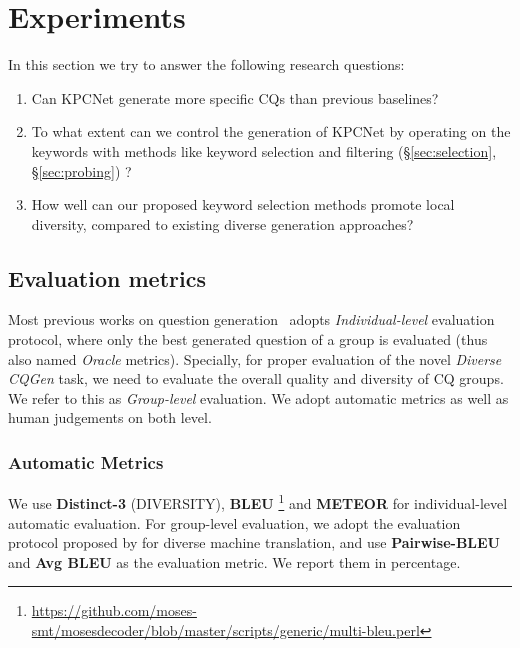 \section{Experiments}
\label{sec:experiments}
In this section we try to answer the following research questions: 
\begin{enumerate}
  \item Can KPCNet generate more specific CQs than previous baselines? 
  \item To what extent can we control the generation of KPCNet by operating on the keywords with methods like keyword selection and filtering (\S \ref{sec:selection}, \S \ref{sec:probing}) ?
  \item How well can our proposed keyword selection methods promote local diversity, compared to existing diverse generation approaches?
\end{enumerate}

\subsection{Evaluation metrics}
Most previous works on question 
generation~\citep{jain2017creativity, hu2018aspect, rao2019answer} 
adopts \textit{Individual-level} evaluation protocol, where only the best generated question of a group is evaluated (thus also named \textit{Oracle} metrics). Specially, for proper evaluation of the novel \textit{Diverse CQGen} task, we need to evaluate the overall quality and diversity of CQ groups. We refer to this as \textit{Group-level} evaluation. We adopt automatic metrics as well as human judgements on both level. 

\subsubsection{Automatic Metrics}
We use \textbf{Distinct-3} (DIVERSITY), 
\textbf{BLEU}
\footnote{\url{https://github.com/moses-smt/mosesdecoder/blob/master/scripts/generic/multi-bleu.perl}}
\citep{papineni2002bleu} and 
\textbf{METEOR} \citep{banerjee2005meteor} for individual-level automatic evaluation.
For group-level evaluation, we adopt the evaluation protocol proposed by \citet{shen2019mixture} for diverse machine translation, and use \textbf{Pairwise-BLEU} and \textbf{Avg BLEU} as the evaluation metric. We report them in percentage.
